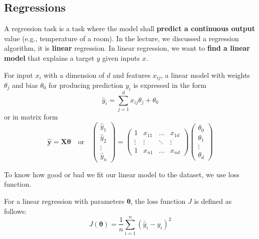 \documentclass[10pt]{article}
\begin{document}
\subsection{Regressions}

A regression task is a task where the model shall \textbf{predict a 
continuous output} value (e.g., temperature of a room). In the lecture, 
we discussed a regression algorithm, it is \textbf{linear} regression.
In linear regression, we want to \textbf{find a linear model} that explains a target $y$
given inputs $x$. 

\begin{definition}
    For input $x_i$ with a dimension of $d$ and features $x_{ij}$, a linear model with 
    weights $\theta_j$ and bias $\theta_0$ for producing prediction $y_i$ is expressed in the form 
    \begin{equation*}
        \hat{y}_i = \sum_{j=1}^d x_{ij} \theta_j + \theta_0
    \end{equation*}
    or in matrix form 
    \begin{equation*}
        \mathbf{\hat{y}} = \mathbf{X} \pmb{\theta} \quad \text{or} \quad
        \left(\begin{matrix}
            \hat{y}_1 \\ \hat{y}_2 \\ \vdots \\ \hat{y}_n
        \end{matrix}\right) = 
        \left(\begin{matrix}
            1 & x_{11} & \dots & x_{1d} \\
            \vdots & \vdots & \ddots & \vdots \\
            1 & x_{n1} & \dots & x_{nd}
        \end{matrix}\right) 
        \left(\begin{matrix}
            \theta_0 \\ \theta_1 \\ \vdots \\ \theta_d
        \end{matrix}\right)
    \end{equation*}
\end{definition} 

To know how good or bad we fit our linear model to the dataset, 
we use loss function.

\begin{definition}
    For a linear regression with parameters $\pmb\theta$, the loss function $J$ 
    is defined as follows:
    \begin{equation*}
        J(\pmb\theta) = \frac{1}{n} \sum_{i=1}^n (\hat{y}_i - y_i)^2
    \end{equation*}
\end{definition}
\end{document}
